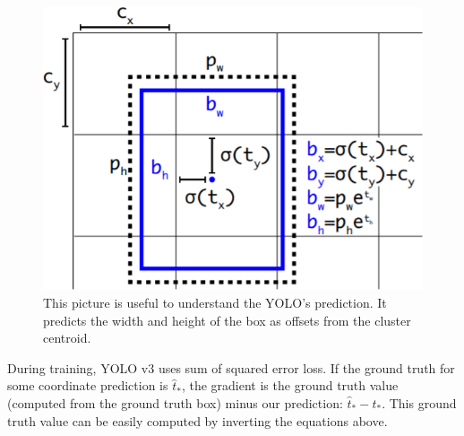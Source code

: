 \begin{figure}[h!]
	\centering
	\includegraphics[width=0.5\linewidth]{images/bound.png}
	\caption{This picture is useful to understand the YOLO's prediction. It predicts the width and height of the box as offsets from the cluster centroid.}
\end{figure}

During training, YOLO v3 uses sum of squared error loss. If the
ground truth for some coordinate prediction is $\hat{t}_*$, the gradient is the ground truth value (computed from the ground
truth box) minus our prediction: $\hat{t}_* - t_*$. This ground truth
value can be easily computed by inverting the equations
above.
\newpage 

